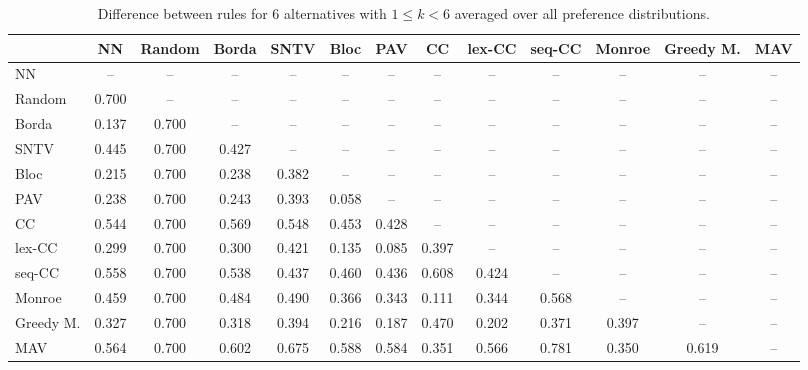 
\begin{table*}[htbp]
\centering
\begin{tabular}{lcccccccccccc}
\toprule
 & NN & Random & Borda & SNTV & Bloc & PAV & CC & lex-CC & seq-CC & Monroe & Greedy M. & MAV \\
\midrule
NN & -- & -- & -- & -- & -- & -- & -- & -- & -- & -- & -- & -- \\
Random & \cellcolor{blue!70} 0.700 & -- & -- & -- & -- & -- & -- & -- & -- & -- & -- & -- \\
Borda & \cellcolor{blue!13} 0.137 & \cellcolor{blue!70} 0.700 & -- & -- & -- & -- & -- & -- & -- & -- & -- & -- \\
SNTV & \cellcolor{blue!44} 0.445 & \cellcolor{blue!70} 0.700 & \cellcolor{blue!42} 0.427 & -- & -- & -- & -- & -- & -- & -- & -- & -- \\
Bloc & \cellcolor{blue!21} 0.215 & \cellcolor{blue!70} 0.700 & \cellcolor{blue!23} 0.238 & \cellcolor{blue!38} 0.382 & -- & -- & -- & -- & -- & -- & -- & -- \\
PAV & \cellcolor{blue!23} 0.238 & \cellcolor{blue!70} 0.700 & \cellcolor{blue!24} 0.243 & \cellcolor{blue!39} 0.393 & \cellcolor{blue!5} 0.058 & -- & -- & -- & -- & -- & -- & -- \\
CC & \cellcolor{blue!54} 0.544 & \cellcolor{blue!70} 0.700 & \cellcolor{blue!56} 0.569 & \cellcolor{blue!54} 0.548 & \cellcolor{blue!45} 0.453 & \cellcolor{blue!42} 0.428 & -- & -- & -- & -- & -- & -- \\
lex-CC & \cellcolor{blue!29} 0.299 & \cellcolor{blue!70} 0.700 & \cellcolor{blue!30} 0.300 & \cellcolor{blue!42} 0.421 & \cellcolor{blue!13} 0.135 & \cellcolor{blue!8} 0.085 & \cellcolor{blue!39} 0.397 & -- & -- & -- & -- & -- \\
seq-CC & \cellcolor{blue!55} 0.558 & \cellcolor{blue!70} 0.700 & \cellcolor{blue!53} 0.538 & \cellcolor{blue!43} 0.437 & \cellcolor{blue!46} 0.460 & \cellcolor{blue!43} 0.436 & \cellcolor{blue!60} 0.608 & \cellcolor{blue!42} 0.424 & -- & -- & -- & -- \\
Monroe & \cellcolor{blue!45} 0.459 & \cellcolor{blue!70} 0.700 & \cellcolor{blue!48} 0.484 & \cellcolor{blue!49} 0.490 & \cellcolor{blue!36} 0.366 & \cellcolor{blue!34} 0.343 & \cellcolor{blue!11} 0.111 & \cellcolor{blue!34} 0.344 & \cellcolor{blue!56} 0.568 & -- & -- & -- \\
Greedy M. & \cellcolor{blue!32} 0.327 & \cellcolor{blue!70} 0.700 & \cellcolor{blue!31} 0.318 & \cellcolor{blue!39} 0.394 & \cellcolor{blue!21} 0.216 & \cellcolor{blue!18} 0.187 & \cellcolor{blue!47} 0.470 & \cellcolor{blue!20} 0.202 & \cellcolor{blue!37} 0.371 & \cellcolor{blue!39} 0.397 & -- & -- \\
MAV & \cellcolor{blue!56} 0.564 & \cellcolor{blue!70} 0.700 & \cellcolor{blue!60} 0.602 & \cellcolor{blue!67} 0.675 & \cellcolor{blue!58} 0.588 & \cellcolor{blue!58} 0.584 & \cellcolor{blue!35} 0.351 & \cellcolor{blue!56} 0.566 & \cellcolor{blue!78} 0.781 & \cellcolor{blue!35} 0.350 & \cellcolor{blue!61} 0.619 & -- \\
\bottomrule
\end{tabular}

\caption{Difference between rules for 6 alternatives with $1 \leq k < 6$ averaged over all preference distributions.}
\label{tab:rule_distance_heatmap-m=[6]-pref_dist=all}
\end{table*}
    